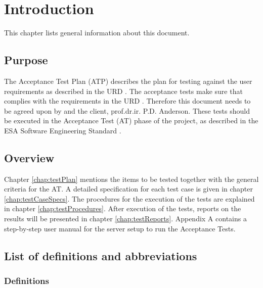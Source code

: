 \chapter{Introduction}
\label{chap:intro}
This chapter lists general information about this document.

\section{Purpose}
\label{sec:purpose}
The Acceptance Test Plan (ATP) describes the plan for testing \projectname{} against the user requirements as described in the URD \cite{urd}. The acceptance tests make sure that
\projectname{} complies with the requirements in the URD \cite{urd}. Therefore this document needs to be agreed upon by \projectauthor{} and the client, prof.dr.ir. P.D. Anderson.
These tests should be executed in the Acceptance Test (AT) phase of the \projectname{} project, as described in the ESA Software Engineering Standard \cite{esa}.

\section{Overview}
\label{sec:overview}
Chapter \ref{chap:testPlan} mentions the items to be tested together with the general criteria for the AT. A detailed specification for each test case is given in chapter \ref{chap:testCaseSpecs}. The procedures for the execution of the tests are explained in chapter \ref{chap:testProcedures}. After execution of the tests, reports on the results will be presented in chapter \ref{chap:testReports}.
Appendix A contains a step-by-step user manual for the server setup to run the Acceptance Tests.

\section{List of definitions and abbreviations}
\label{sec:listofdef}

\subsection{Definitions}
\label{subsec:def}

